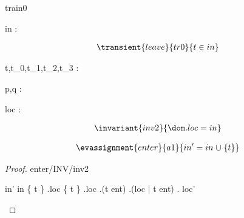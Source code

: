 \documentclass[12pt]{amsart}
\title{}
\author{}
\date{} %
\begin{document}
\maketitle
\tableofcontents


\begin{machine}{train0}


%
	\begin{variable}
		in : \set[\TRAIN]
	\end{variable}
%



\begin{align*}
\transient{leave}{tr0}
{	t \in in}
\end{align*}

\begin{dummy}
	t,t_0,t_1,t_2,t_3 : \TRAIN
\end{dummy}

\begin{dummy}
	p,q : \BLK
\end{dummy}


\begin{variable}
	loc : \TRAIN \pfun \BLK
\end{variable}

\begin{align*}
\invariant{inv2}
{	\dom . loc = in }
\end{align*}

\begin{align*}
\evassignment{enter}{a1}
{	in' = in \bunion \{ t \} }
\end{align*}

\begin{proof}{enter/INV/inv2}
	\begin{calculation}
		in'
	\hint{=}{ \ref{a1} }
		in \bunion \{ t \}
	\hint{=}{ \ref{inv2} }
		\dom.loc \bunion \{ t \}
		\dom.loc \bunion \dom.(t \tfun ent)
		\dom.(loc  \1 |   t \tfun ent)
	\hint{=}{ \ref{a2} }
		\dom. loc' 
	\end{calculation}
\end{proof}


\end{machine}
\end{document}
